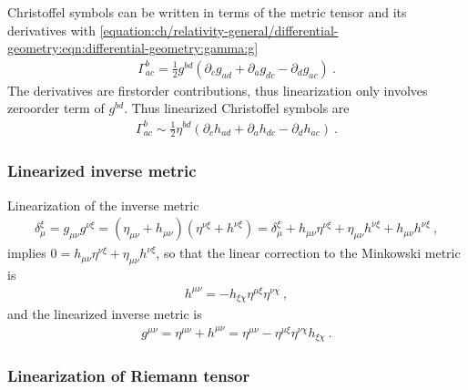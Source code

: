 \documentclass[letterpaper,10pt,english]{jupyterBook}
\begin{document}
\sphinxAtStartPar
Christoffel symbols can be written in terms of the metric tensor and its derivatives with \eqref{equation:ch/relativity-general/differential-geometry:eqn:differential-geometry:gamma:g}
\begin{equation*}
\begin{split}\Gamma_{ac}^{b} = \frac{1}{2} g^{bd} \left( \partial_c g_{ad} + \partial_a g_{dc} - \partial_{d} g_{ac} \right) \ .\end{split}
\end{equation*}
\sphinxAtStartPar
The derivatives are first\sphinxhyphen{}order contributions, thus linearization only involves zero\sphinxhyphen{}order term of \(g^{bd}\). Thus linearized Christoffel symbols are
\begin{equation*}
\begin{split}\Gamma_{ac}^{b} \sim \frac{1}{2} \eta^{bd} \left( \partial_c h_{ad} + \partial_a h_{dc} - \partial_{d} h_{ac} \right) \ .\end{split}
\end{equation*}\subsubsection*{Linearized inverse metric}

\sphinxAtStartPar
Linearization of the inverse metric
\begin{equation*}
\begin{split}\delta_{\mu}^{\xi} = g_{\mu \nu} g^{\nu \xi} = ( \eta_{\mu \nu} + h_{\mu \nu} ) ( \eta^{\nu \xi} + h^{\nu \xi} ) = \delta_{\mu}^{\xi} + h_{\mu \nu} \eta^{\nu \xi} + \eta_{\mu \nu} h^{\nu \xi} + h_{\mu \nu} h^{\nu \xi} \ , \end{split}
\end{equation*}
\sphinxAtStartPar
implies \(0 = h_{\mu \nu} \eta^{\nu \xi} + \eta_{\mu \nu} h^{\nu \xi}\), so that the linear correction to the Minkowski metric is
\begin{equation*}
\begin{split}h^{\mu \nu} = - h_{\xi \chi} \eta^{\mu \xi} \eta^{\nu \chi} \ ,\end{split}
\end{equation*}
\sphinxAtStartPar
and the linearized inverse metric is
\begin{equation*}
\begin{split}g^{\mu \nu} = \eta^{\mu \nu} + h^{\mu \nu} = \eta^{\mu \nu} - \eta^{\mu \xi} \eta^{\nu \chi} h_{\xi \chi} \ .\end{split}
\end{equation*}\subsubsection*{Linearization of Riemann tensor}
\end{document}

